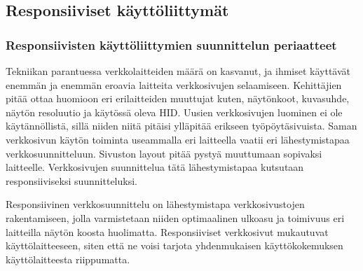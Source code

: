 \documentclass[11pt,a4paper,titlepage,oneside]{article}
\begin{document}
\newpage
{}        %













\newpage
\subsection{Responsiiviset käyttöliittymät}        %


\subsubsection{Responsiivisten käyttöliittymien suunnittelun periaatteet}







Tekniikan parantuessa verkkolaitteiden määrä on kasvanut, ja ihmiset käyttävät enemmän ja enemmän eroavia laitteita verkkosivujen selaamiseen.\citemissing
Kehittäjien pitää ottaa huomioon eri erilaitteiden muuttujat kuten, näytönkoot, kuvasuhde, näytön resoluutio ja käytössä oleva HID.\citemissing
Uusien verkkosivujen luominen ei ole käytännöllistä, sillä niiden niitä pitäisi ylläpitää erikseen työpöytäsivuista.
Saman verkkosivun käytön toiminta useammalla eri laitteella vaatii eri lähestymistapaa verkkosuunnitteluun. 
Sivuston layout pitää pystyä muuttumaan sopivaksi laitteelle.
Verkkosivujen suunnittelua tätä lähestymistapaa kutsutaan responsiiviseksi suunnitteluksi. \citemissing
\medskip



Responsiivinen verkkosuunnittelu on lähestymistapa verkkosivustojen rakentamiseen,
jolla varmistetaan niiden optimaalinen ulkoasu ja toimivuus eri laitteilla näytön koosta huolimatta.\citemissing
Responsiiviset verkkosivut mukautuvat käyttölaitteeseen, siten että ne voisi tarjota yhdenmukaisen käyttökokemuksen käyttölaitteesta riippumatta.
\medskip
\end{document}
